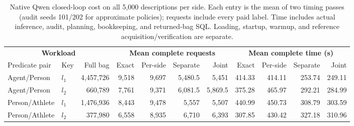 \begin{table}[t]
\centering
\caption{Native Qwen closed-loop cost on all 5,000 descriptions per side. Each entry is the mean of two timing passes (audit seeds 101/202 for approximate policies); requests include every paid label. Time includes actual inference, audit, planning, bookkeeping, and returned-bag SQL. Loading, startup, warmup, and reference acquisition/verification are separate.}
\label{tab:native_live_cost}
\small
\setlength{\tabcolsep}{4pt}
\begin{tabular*}{\textwidth}{@{\extracolsep{\fill}}llr*{8}{r}@{}}
\toprule
\multicolumn{3}{c}{\textbf{Workload}} & \multicolumn{4}{c}{\textbf{Mean complete requests}} & \multicolumn{4}{c}{\textbf{Mean complete time (s)}} \\
\cmidrule(lr){1-3}\cmidrule(lr){4-7}\cmidrule(l){8-11}
Predicate pair & Key & Full bag & Exact & Per-side & Separate & Joint & Exact & Per-side & Separate & Joint \\
\midrule
Agent/Person & $l_1$ & 4,457,726 & 9,518 & 9,697 & 5,480.5 & 5,451 & 414.33 & 414.11 & 253.74 & 249.11 \\
Agent/Person & $l_2$ & 660,789 & 7,761 & 9,371 & 6,081.5 & 5,869.5 & 375.28 & 465.97 & 292.21 & 284.99 \\
Person/Athlete & $l_1$ & 1,476,936 & 8,443 & 9,478 & 5,557 & 5,507 & 440.99 & 450.73 & 308.79 & 303.59 \\
Person/Athlete & $l_2$ & 377,980 & 6,558 & 8,935 & 6,710 & 6,393 & 307.85 & 430.42 & 327.18 & 310.96 \\
\bottomrule
\end{tabular*}
\end{table}
